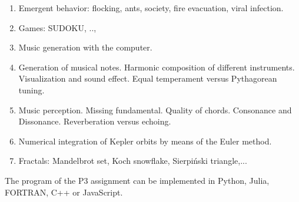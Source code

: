 \documentclass[12pt,spanish]{article}
\begin{document}
\begin{enumerate}





\item Emergent behavior: flocking, ants, society, fire evacuation, viral infection. 
\item Games: SUDOKU, ..,



%

\item Music generation with the computer. 

\item Generation of musical notes. Harmonic composition of different instruments. Visualization and sound effect.
Equal temperament versus Pythagorean tuning. 

\item Music perception. Missing fundamental. Quality of chords. Consonance and Dissonance. 
Reverberation versus echoing. 

\item Numerical integration of Kepler orbits by means of the Euler method. 
 
 \item Fractals: Mandelbrot set, Koch snowflake, Sierpiński triangle,... 
 
\end{enumerate}
The program of the  P3 assignment can be implemented in Python, Julia, FORTRAN, C++ or JavaScript. 
\end{document}
